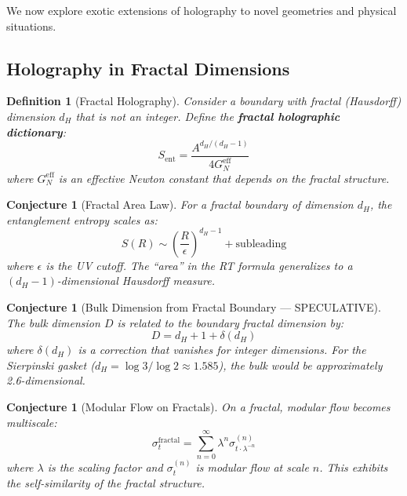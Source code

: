 \documentclass[12pt,a4paper]{article}
\newtheorem{conjecture}[theorem]{Conjecture}
\newtheorem{definition}[theorem]{Definition}
\begin{document}
We now explore exotic extensions of holography to novel geometries and physical situations.

\subsection{Holography in Fractal Dimensions}

\begin{definition}[Fractal Holography]
Consider a boundary with fractal (Hausdorff) dimension $d_H$ that is not an integer. Define the \textbf{fractal holographic dictionary}:
\begin{equation}
S_{\text{ent}} = \frac{A^{d_H/(d_H-1)}}{4G_N^{\text{eff}}}
\end{equation}
where $G_N^{\text{eff}}$ is an effective Newton constant that depends on the fractal structure.
\end{definition}

\begin{conjecture}[Fractal Area Law]
For a fractal boundary of dimension $d_H$, the entanglement entropy scales as:
\begin{equation}
S(R) \sim \left( \frac{R}{\epsilon} \right)^{d_H - 1} + \text{subleading}
\end{equation}
where $\epsilon$ is the UV cutoff. The ``area'' in the RT formula generalizes to a $(d_H - 1)$-dimensional Hausdorff measure.
\end{conjecture}

\begin{conjecture}[Bulk Dimension from Fractal Boundary --- SPECULATIVE]
The bulk dimension $D$ is related to the boundary fractal dimension by:
\begin{equation}
D = d_H + 1 + \delta(d_H)
\end{equation}
where $\delta(d_H)$ is a correction that vanishes for integer dimensions. For the Sierpinski gasket ($d_H = \log 3/\log 2 \approx 1.585$), the bulk would be approximately 2.6-dimensional.
\end{conjecture}

\begin{conjecture}[Modular Flow on Fractals]
On a fractal, modular flow becomes multiscale:
\begin{equation}
\sigma_t^{\text{fractal}} = \sum_{n=0}^\infty \lambda^n \sigma_{t \cdot \lambda^{-n}}^{(n)}
\end{equation}
where $\lambda$ is the scaling factor and $\sigma_t^{(n)}$ is modular flow at scale $n$. This exhibits the self-similarity of the fractal structure.
\end{conjecture}
\end{document}
